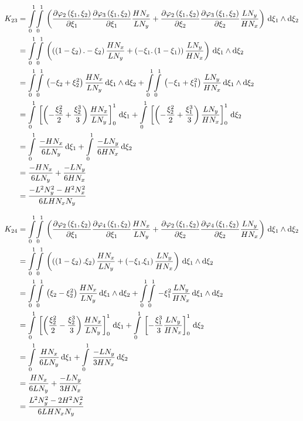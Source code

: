 \begin{equation}
  \begin{aligned}
    K_{23}&=\giint{0}{1}{0}{1}{\pbrac{\delby{\lbfn{2}{\xi_{1},\xi_{2}}}{\xi_{1}}\delby{\lbfn{3}{\xi_{1},\xi_{2}}}{\xi_{1}}
        \dfrac{H N_{x}}{L N_{y}}+\delby{\lbfn{2}{\xi_{1},\xi_{2}}}{\xi_{2}}\delby{\lbfn{3}{\xi_{1},\xi_{2}}}{\xi_{2}}
        \dfrac{L N_{y}}{H N_{x}}}}{\xi_{1}}{\xi_{2}}\\
    &=\giint{0}{1}{0}{1}{\pbrac{\pbrac{\pbrac{1-\xi_{2}}.-\xi_{2}}\dfrac{H N_{x}}{L N_{y}}+
    \pbrac{-\xi_{1}.\pbrac{1-\xi_{1}}}\dfrac{L N_{y}}{H N_{x}}}}{\xi_{1}}{\xi_{2}} \\
    &=\giint{0}{1}{0}{1}{\pbrac{-\xi_{2}+\xi_{2}^{2}}\dfrac{H N_{x}}{L N_{y}}}{\xi_{1}}{\xi_{2}}+
    \giint{0}{1}{0}{1}{\pbrac{-\xi_{1}+\xi_{1}^{2}}\dfrac{L N_{y}}{H N_{x}}}{\xi_{1}}{\xi_{2}} \\
    &=\gint{0}{1}{\sqbrac{\pbrac{-\dfrac{\xi_{2}^{2}}{2}+\dfrac{\xi_{2}^{3}}{3}}\dfrac{H N_{x}}{L N_{y}}}_{0}^{1}}{\xi_{1}}+
    \gint{0}{1}{\sqbrac{\pbrac{-\dfrac{\xi_{2}^{2}}{2}+\dfrac{\xi_{1}^{3}}{3}}\dfrac{L N_{y}}{H N_{x}}}_{0}^{1}}{\xi_{2}} \\
    &=\gint{0}{1}{\dfrac{-H N_{x}}{6 L N_{y}}}{\xi_{1}}+\gint{0}{1}{\dfrac{-L N_{y}}{6 H N_{x}}}{\xi_{2}} \\
    &=\dfrac{-H N_{x}}{6 L N_{y}}+\dfrac{-L N_{y}}{6 H N_{x}} \\
    &=\dfrac{-L^{2}N_{y}^{2}-H^{2}N_{x}^{2}}{6 L H N_{x} N_{y}}
  \end{aligned}
\end{equation}

\begin{equation}
  \begin{aligned}
    K_{24}&=\giint{0}{1}{0}{1}{\pbrac{\delby{\lbfn{2}{\xi_{1},\xi_{2}}}{\xi_{1}}\delby{\lbfn{4}{\xi_{1},\xi_{2}}}{\xi_{1}}
        \dfrac{H N_{x}}{L N_{y}}+\delby{\lbfn{2}{\xi_{1},\xi_{2}}}{\xi_{2}}\delby{\lbfn{4}{\xi_{1},\xi_{2}}}{\xi_{2}}
        \dfrac{L N_{y}}{H N_{x}}}}{\xi_{1}}{\xi_{2}}\\
    &=\giint{0}{1}{0}{1}{\pbrac{\pbrac{\pbrac{1-\xi_{2}}.\xi_{2}}\dfrac{H N_{x}}{L N_{y}}+
    \pbrac{-\xi_{1}.\xi_{1}}\dfrac{L N_{y}}{H N_{x}}}}{\xi_{1}}{\xi_{2}} \\
    &=\giint{0}{1}{0}{1}{\pbrac{\xi_{2}-\xi_{2}^{2}}\dfrac{H N_{x}}{L N_{y}}}{\xi_{1}}{\xi_{2}}+
    \giint{0}{1}{0}{1}{-\xi_{1}^{2}\dfrac{L N_{y}}{H N_{x}}}{\xi_{1}}{\xi_{2}} \\
    &=\gint{0}{1}{\sqbrac{\pbrac{\dfrac{\xi_{2}^{2}}{2}-\dfrac{\xi_{2}^{3}}{3}}\dfrac{H N_{x}}{L N_{y}}}_{0}^{1}}{\xi_{1}}+
    \gint{0}{1}{\sqbrac{-\dfrac{\xi_{1}^{3}}{3}\dfrac{L N_{y}}{H N_{x}}}_{0}^{1}}{\xi_{2}} \\
    &=\gint{0}{1}{\dfrac{H N_{x}}{6 L N_{y}}}{\xi_{1}}+\gint{0}{1}{\dfrac{-L N_{y}}{3 H N_{x}}}{\xi_{2}} \\
    &=\dfrac{H N_{x}}{6 L N_{y}}+\dfrac{-L N_{y}}{3 H N_{x}} \\
    &=\dfrac{L^{2}N_{y}^{2}-2 H^{2}N_{x}^{2}}{6 L H N_{x} N_{y}}
  \end{aligned}
\end{equation}

